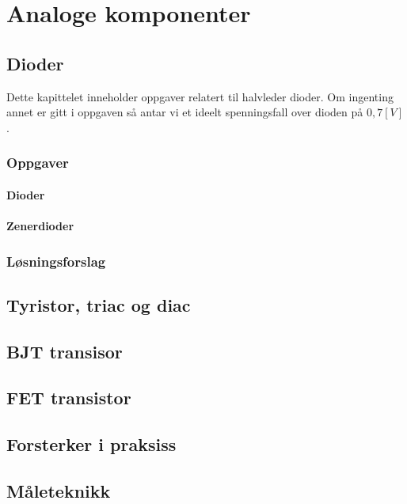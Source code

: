 \documentclass[12pt]{report}
\begin{document}


\tableofcontents



\chapter{Analoge komponenter}



\section{Dioder}


Dette kapittelet inneholder oppgaver relatert til halvleder dioder. Om ingenting annet er gitt i oppgaven så antar vi et ideelt spenningsfall over dioden på $0,7[V]$.\\

\subsection{Oppgaver}
\subsubsection{Dioder}

\subsubsection{Zenerdioder}


\subsection{Løsningsforslag}
\printsolutions[section]



\newpage

\section{Tyristor, triac og diac}

\printsolutions[section]

\section{BJT transisor}

\section{FET transistor}

\section{Forsterker i praksiss}

\section{Måleteknikk}

\newpage

\printbibliography[heading=bibintoc, title={Referanser}]
\end{document}
